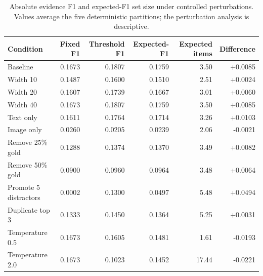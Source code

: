 \begin{table}[t]
\centering
\caption{Absolute evidence F1 and expected-F1 set size under controlled perturbations. Values average the five deterministic partitions; the perturbation analysis is descriptive.}
\label{tab:robustness-absolute}
\small
\begin{tabular}{lrrrrr}
\toprule
Condition & Fixed F1 & Threshold F1 & Expected-F1 & Expected items & Difference \\
\midrule
Baseline & 0.1673 & 0.1807 & 0.1759 & 3.50 & +0.0085 \\
Width 10 & 0.1487 & 0.1600 & 0.1510 & 2.51 & +0.0024 \\
Width 20 & 0.1607 & 0.1739 & 0.1667 & 3.01 & +0.0060 \\
Width 40 & 0.1673 & 0.1807 & 0.1759 & 3.50 & +0.0085 \\
Text only & 0.1611 & 0.1764 & 0.1714 & 3.26 & +0.0103 \\
Image only & 0.0260 & 0.0205 & 0.0239 & 2.06 & -0.0021 \\
Remove 25\% gold & 0.1288 & 0.1374 & 0.1370 & 3.49 & +0.0082 \\
Remove 50\% gold & 0.0900 & 0.0960 & 0.0964 & 3.48 & +0.0064 \\
Promote 5 distractors & 0.0002 & 0.1300 & 0.0497 & 5.48 & +0.0494 \\
Duplicate top 3 & 0.1333 & 0.1450 & 0.1364 & 5.25 & +0.0031 \\
Temperature 0.5 & 0.1673 & 0.1605 & 0.1481 & 1.61 & -0.0193 \\
Temperature 2.0 & 0.1673 & 0.1023 & 0.1452 & 17.44 & -0.0221 \\
\bottomrule
\end{tabular}
\end{table}
